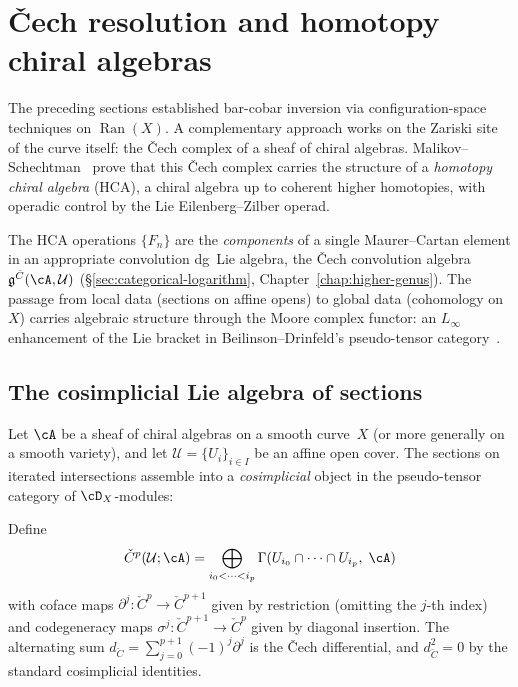 
\section{\v{C}ech resolution and homotopy chiral algebras}
\label{sec:cech-hca}

The preceding sections established bar-cobar inversion via
configuration-space techniques on $\operatorname{Ran}(X)$.
A complementary approach works on the Zariski site of the
curve itself: the \v{C}ech complex of a sheaf of chiral
algebras.
Malikov--Schechtman~\cite{MS24} prove that this \v{C}ech complex
carries the structure of a \emph{homotopy chiral algebra}
(HCA), a chiral algebra up to coherent higher homotopies, with
operadic control by the Lie Eilenberg--Zilber operad.

The HCA operations $\{F_n\}$
are the \emph{components} of
a single Maurer--Cartan element in an appropriate convolution
dg~Lie algebra, the \v{C}ech convolution algebra
$\mathfrak{g}^{\check{C}}(\cA,\mathcal{U})$
(\S\ref{sec:categorical-logarithm},
Chapter~\ref{chap:higher-genus}). The passage from local data (sections on affine opens) to
global data (cohomology on~$X$) carries algebraic structure through the Moore
complex functor: an $L_\infty$
enhancement of the Lie bracket in Beilinson--Drinfeld's
pseudo-tensor category~\cite{BD04}.

\subsection{The cosimplicial Lie algebra of sections}
\label{subsec:cosimplicial-cech}

Let $\cA$ be a sheaf of chiral algebras on a smooth curve~$X$
(or more generally on a smooth variety), and let
$\mathcal{U} = \{U_i\}_{i \in I}$ be an affine open cover.
The sections on iterated intersections assemble into a
\emph{cosimplicial} object in the pseudo-tensor category of
$\cD_X$-modules:

\begin{definition}
\label{def:cosimplicial-cech}
Define
\[
\check{C}^p(\mathcal{U};\cA)
 = \bigoplus_{i_0 < \cdots < i_p}
 \Gamma(U_{i_0} \cap \cdots \cap U_{i_p},\;\cA)
\]
with coface maps
$\partial^j\colon \check{C}^p \to \check{C}^{p+1}$
given by restriction (omitting the $j$-th index) and
codegeneracy maps
$\sigma^j\colon \check{C}^{p+1} \to \check{C}^p$ given by
diagonal insertion. The alternating sum
$d_{\check{C}} = \sum_{j=0}^{p+1}(-1)^j\partial^j$
is the \v{C}ech differential, and $d_{\check{C}}^2 = 0$ by the
standard cosimplicial identities.
\end{definition}

